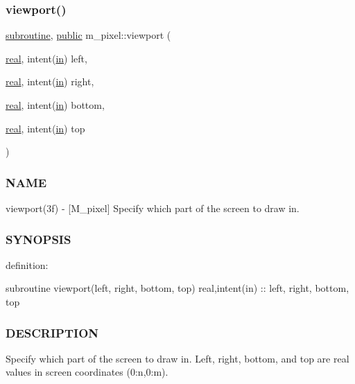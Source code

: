 \subsubsection{\texorpdfstring{viewport()}{viewport()}}
{\footnotesize\ttfamily \hyperlink{M__stopwatch_83_8txt_acfbcff50169d691ff02d4a123ed70482}{subroutine}, \hyperlink{M__stopwatch_83_8txt_a2f74811300c361e53b430611a7d1769f}{public} m\+\_\+pixel\+::viewport (\begin{DoxyParamCaption}\item[{\hyperlink{read__watch_83_8txt_abdb62bde002f38ef75f810d3a905a823}{real}, intent(\hyperlink{M__journal_83_8txt_afce72651d1eed785a2132bee863b2f38}{in})}]{left,  }\item[{\hyperlink{read__watch_83_8txt_abdb62bde002f38ef75f810d3a905a823}{real}, intent(\hyperlink{M__journal_83_8txt_afce72651d1eed785a2132bee863b2f38}{in})}]{right,  }\item[{\hyperlink{read__watch_83_8txt_abdb62bde002f38ef75f810d3a905a823}{real}, intent(\hyperlink{M__journal_83_8txt_afce72651d1eed785a2132bee863b2f38}{in})}]{bottom,  }\item[{\hyperlink{read__watch_83_8txt_abdb62bde002f38ef75f810d3a905a823}{real}, intent(\hyperlink{M__journal_83_8txt_afce72651d1eed785a2132bee863b2f38}{in})}]{top }\end{DoxyParamCaption})}



\subsubsection*{N\+A\+ME}

viewport(3f) -\/ \mbox{[}M\+\_\+pixel\mbox{]} Specify which part of the screen to draw in. 

\subsubsection*{S\+Y\+N\+O\+P\+S\+IS}

definition\+:

subroutine viewport(left, right, bottom, top) real,intent(in) \+:\+: left, right, bottom, top

\subsubsection*{D\+E\+S\+C\+R\+I\+P\+T\+I\+ON}

Specify which part of the screen to draw in. Left, right, bottom, and top are real values in screen coordinates (0\+:n,0\+:m).

